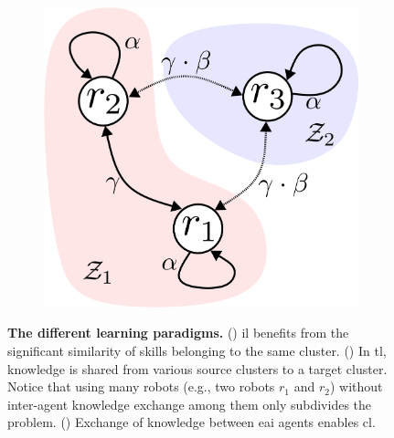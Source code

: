\documentclass[12pt]{article}
\begin{document}
\begin{figure}[!t]
\begin{subfigure}[t]{0.32\textwidth}
	\end{subfigure}
	\hfill
	\begin{subfigure}[t]{0.32\textwidth}
		\subcaption{}
		\includegraphics[width=\textwidth]{cl_example_figure.png} \label{fig:cl_example_figure}
	\end{subfigure}	
	\hspace*{\fill}
	\caption[] {\label{fig:learning_paradigms_conceptual_figure} \textbf{The different learning paradigms.} () \Acl{il} benefits from the significant similarity of skills belonging to the same cluster. () In \acl{tl}, knowledge is shared from various source clusters to a target cluster. Notice that using many robots (e.g., two robots $r_1$ and $r_2$) without inter-agent knowledge exchange among them only subdivides the problem. () Exchange of knowledge between \ac{eai} agents enables \acl{cl}.}
\end{figure}
\end{document}
